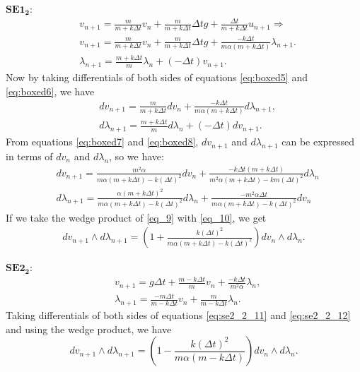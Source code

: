 \documentclass[a4paper, 10pt]{article}
\newcommand{\SEot}{SE1_2}
\newcommand{\SEtt}{SE2_2}
\begin{document}
$\bm{\SEot:}$
\begin{align}
&   v_{n+1} = \frac{m}{m + k\Delta{t}} v_{n} +  \frac{m}{m + k\Delta{t}}\Delta{t}g + \frac{\Delta{t}}{m + k\Delta{t}} u_{n+1} \Rightarrow  \nonumber \\ &
\boxed{v_{n+1}  = \frac{m}{m + k\Delta{t}} v_{n} + \frac{m}{m + k\Delta{t}}\Delta{t}g + \frac{-k\Delta{t}}{m\alpha(m + k\Delta{t})} \lambda_{n+1}.} \label{eq:boxed5} \\ &
\boxed{\lambda_{n+1} = \frac{m+k\Delta{t}}{m} \lambda_{n} + (-\Delta{t})v_{n+1}.} \label{eq:boxed6}
\end{align}
Now by taking differentials of both sides of equations \eqref{eq:boxed5} and \eqref{eq:boxed6}, we have
\begin{align}
    &  dv_{n+1}  = \frac{m}{m + k\Delta{t}} dv_{n}  + \frac{-k\Delta{t}}{m\alpha(m + k\Delta{t})} d\lambda_{n+1} \label{eq:boxed7}, \\
    & d\lambda_{n+1} = \frac{m+k\Delta{t}}{m} d\lambda_{n} + (-\Delta{t}) dv_{n+1}. \label{eq:boxed8}
\end{align}
From equations \eqref{eq:boxed7} and \eqref{eq:boxed8}, $dv_{n+1}$ and $d\lambda_{n+1}$ can be expressed in terms of $dv_{n}$ and $d\lambda_{n}$, so we have:
\begin{align}
    &  dv_{n+1}  = \frac{m^2\alpha}{m\alpha(m + k\Delta{t})-k(\Delta{t})^2} dv_{n}  +  \frac{-k\Delta{t}(m+k\Delta{t})}{m^2\alpha(m+k\Delta{t})-km(\Delta{t})^2}d\lambda_{n} \label{eq_9} \\
    & d\lambda_{n+1} = \frac{\alpha(m+k\Delta{t})^2}{m\alpha(m+k\Delta{t})-k(\Delta{t})^2}d\lambda_{n} + \frac{-m^2\alpha\Delta{t}}{m\alpha(m+k\Delta{t})-k(\Delta{t})^2} dv_{n} \label{eq_10}
\end{align}
If we take the wedge product of \eqref{eq_9} with \eqref{eq_10}, we get
\begin{align}
    \boxed{dv_{n+1} \wedge d\lambda_{n+1} = \left(1 + \frac{k(\Delta{t})^2}{m\alpha(m+k\Delta{t})-k(\Delta{t})^2}\right) dv_{n} \wedge d\lambda_{n}. }
\end{align}

$\bm{\SEtt:}$
\begin{align}
  & v_{n+1} = g\Delta{t} + \tfrac{m-k\Delta{t}}{m} v_{n} + \tfrac{-k\Delta{t}}{m^2\alpha}\lambda_{n}, \label{eq:se2_2_11} \\
  & \lambda_{n+1} = \tfrac{-m\Delta{t}}{m-k\Delta{t}}v_{n} + \tfrac{m}{m-k\Delta{t}}\lambda_{n}. \label{eq:se2_2_12}
\end{align}
Taking differentials of both sides of equations \eqref{eq:se2_2_11} and \eqref{eq:se2_2_12} and using the wedge product, we have
\begin{equation}
    dv_{n+1} \wedge d\lambda_{n+1} = \left(1 - \frac{k(\Delta{t})^2}{m\alpha(m-k\Delta{t})}\right) dv_{n} \wedge d\lambda_{n}.
    \label{eq:equation4}
\end{equation}
\end{document}
